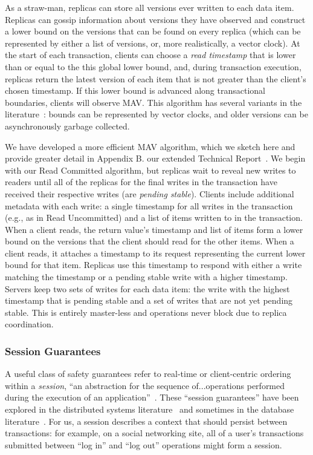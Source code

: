 As a straw-man, replicas can store all versions ever written to each
data item. Replicas can gossip information about versions they have
observed and construct a lower bound on the versions that can be found
on every replica (which can be represented by either a list of
versions, or, more realistically, a vector clock). At the start of
each transaction, clients can choose a \textit{read timestamp} that is
lower than or equal to the this global lower bound, and, during
transaction execution, replicas return the latest version of each item
that is not greater than the client's chosen timestamp. If this lower
bound is advanced along transactional boundaries, clients will observe
MAV. This algorithm has several variants in the
literature~\cite{readonly, swift}: bounds can be represented by vector
clocks, and older versions can be asynchronously garbage collected.

We have developed a more efficient MAV algorithm, which we sketch here
and provide greater detail in \iftechreport Appendix B.  \else our
extended Technical Report~\cite{hat-tr}.  \fi We begin with our Read
Committed algorithm, but replicas wait to reveal new writes to readers
until all of the replicas for the final writes in the transaction have
received their respective writes (are \textit{pending
  stable}). Clients include additional metadata with each write: a
single timestamp for all writes in the transaction (e.g., as in Read
Uncommitted) and a list of items written to in the transaction. When a
client reads, the return value's timestamp and list of items form a
lower bound on the versions that the client should read for the other
items. When a client reads, it attaches a timestamp to its request
representing the current lower bound for that item. Replicas use this
timestamp to respond with either a write matching the timestamp or a
pending stable write with a higher timestamp. Servers keep two sets of
writes for each data item: the write with the highest timestamp that
is pending stable and a set of writes that are not yet pending
stable. This is entirely master-less and operations never block due to
replica coordination.



\subsubsection{Session Guarantees}

A useful class of safety guarantees refer to real-time or
client-centric ordering within a \textit{session}, ``an abstraction
for the sequence of...operations performed during the execution of an
application''~\cite{sessionguarantees}. These ``session guarantees''
have been explored in the distributed systems
literature~\cite{sessionguarantees,vogels-defs} and sometimes in the
database literature~\cite{daudjee-session}. For us, a session
describes a context that should persist between transactions: for
example, on a social networking site, all of a user's transactions
submitted between ``log in'' and ``log out'' operations might form a
session.

